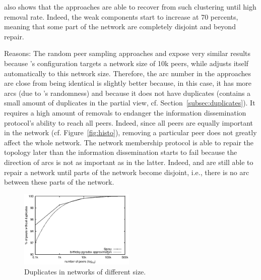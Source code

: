 \begin{asparadesc}
  also shows that the approaches are able to recover from such clustering until
  high removal rate. Indeed, the weak components start to increase at 70
  percents, meaning that some part of the network are completely disjoint and
  beyond repair.
\item[Reasons:] The random peer sampling approaches \CYCLON and \SPRAY expose
  very similar results because \CYCLON's configuration targets a network size
  of 10k peers, while \SPRAY adjusts itself automatically to this network size.
  Therefore, the arc number in the approaches are close from being identical
  \CYCLON is slightly better because, in this case, it has more arcs (due to
  \SPRAY's randomness) and because it does not have duplicates (\SPRAY contains
  a small amount of duplicates in the partial view,
  cf. Section~\ref{subsec:duplicates}). It requires a high amount of removals
  to endanger the information dissemination protocol's ability to reach all
  peers. Indeed, since all peers are equally important in the network
  (cf. Figure~\ref{fig:histo}), removing a particular peer does not greatly
  affect the whole network. The network membership protocol is able to repair
  the topology later than the information dissemination starts to fail because
  the direction of arcs is not as important as in the latter. Indeed, \CYCLON
  and \SPRAY are still able to repair a network until parts of the network
  become disjoint, i.e., there is no arc between these parts of the network.
\end{asparadesc}

\begin{figure}
  \centering
  \includegraphics[width=0.49\textwidth]{img/duplicates.eps}
  \caption{\label{fig:duplicates}Duplicates in networks of different size.}
\end{figure}

\ \\

